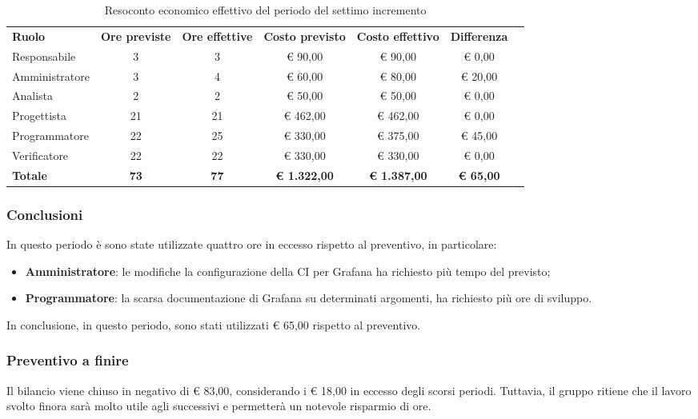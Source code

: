 \documentclass[../piano-di-progetto.tex]{subfiles}
\begin{document}
  \begin{table}[H]
    \centering
    \begin{tabular}{lcccccc}
      \rowcolor{lightgray}
      \textbf{Ruolo}  & \textbf{Ore previste} & \textbf{Ore effettive} & \textbf{Costo previsto} & \textbf{Costo effettivo} & \textbf{Differenza} \\
Responsabile    & 3           & 3           & € 90,00             & € 90,00             & € 0,00           \\
Amministratore  & 3           & 4           & € 60,00             & € 80,00             & € 20,00          \\
Analista        & 2           & 2           & € 50,00             & € 50,00             & € 0,00           \\
Progettista     & 21          & 21          & € 462,00            & € 462,00            & € 0,00           \\
Programmatore   & 22          & 25          & € 330,00            & € 375,00            & € 45,00          \\
Verificatore    & 22          & 22          & € 330,00            & € 330,00            & € 0,00           \\
\textbf{Totale} & \textbf{73} & \textbf{77} & \textbf{€ 1.322,00} & \textbf{€ 1.387,00} & \textbf{€ 65,00}
    \end{tabular}
    \caption{Resoconto economico effettivo del periodo del settimo incremento}
  \end{table}


\subsubsection{Conclusioni}
In questo periodo è sono state utilizzate quattro ore in eccesso rispetto al preventivo, in particolare:
\begin{itemize}
    \item \textbf{Amministratore}: le modifiche la configurazione della CI per Grafana ha richiesto più tempo del previsto;
    \item \textbf{Programmatore}: la scarsa documentazione di Grafana su determinati argomenti, ha richiesto più ore di sviluppo.
\end{itemize}
In conclusione, in questo periodo, sono stati utilizzati € 65,00 rispetto al preventivo.

\subsubsection{Preventivo a finire}
Il bilancio viene chiuso in negativo di € 83,00, considerando i € 18,00 in eccesso degli scorsi periodi. Tuttavia, il gruppo ritiene che il lavoro svolto finora sarà molto utile agli successivi e permetterà un notevole risparmio di ore.
\end{document}
